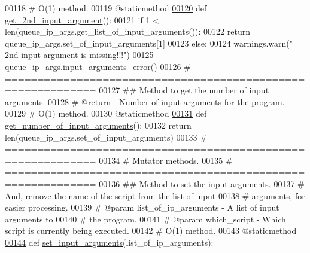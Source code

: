 \begin{DoxyCode}
00118     \textcolor{comment}{#   O(1) method.}
00119     @staticmethod
\hypertarget{queue__ip__arguments_8py_source_l00120}{}\hyperlink{classutilities_1_1queue__ip__arguments_1_1queue__ip__args_a18e59da1e2c8044e79ca32a5455ef40b}{00120}     \textcolor{keyword}{def }\hyperlink{classutilities_1_1queue__ip__arguments_1_1queue__ip__args_a18e59da1e2c8044e79ca32a5455ef40b}{get\_2nd\_input\_argument}():
00121         \textcolor{keywordflow}{if} 1 < len(queue\_ip\_args.get\_list\_of\_input\_arguments()):
00122             \textcolor{keywordflow}{return} queue\_ip\_args.set\_of\_input\_arguments[1]
00123         \textcolor{keywordflow}{else}:
00124             warnings.warn(\textcolor{stringliteral}{" 2nd input argument is missing!!!"})
00125             queue\_ip\_args.input\_arguments\_error()
00126     \textcolor{comment}{# ============================================================}
00127     \textcolor{comment}{##  Method to get the number of input arguments.}
00128     \textcolor{comment}{#   @return - Number of input arguments for the program.}
00129     \textcolor{comment}{#   O(1) method.}
00130     @staticmethod
\hypertarget{queue__ip__arguments_8py_source_l00131}{}\hyperlink{classutilities_1_1queue__ip__arguments_1_1queue__ip__args_ab95a4242fd55bf5d126b35a5f5172593}{00131}     \textcolor{keyword}{def }\hyperlink{classutilities_1_1queue__ip__arguments_1_1queue__ip__args_ab95a4242fd55bf5d126b35a5f5172593}{get\_number\_of\_input\_arguments}():
00132         \textcolor{keywordflow}{return} len(queue\_ip\_args.set\_of\_input\_arguments)
00133     \textcolor{comment}{# ============================================================}
00134     \textcolor{comment}{#   Mutator methods.}
00135     \textcolor{comment}{# ============================================================}
00136     \textcolor{comment}{##  Method to set the input arguments.}
00137     \textcolor{comment}{#       And, remove the name of the script from the list of input}
00138     \textcolor{comment}{#       arguments, for easier processing.}
00139     \textcolor{comment}{#   @param list\_of\_ip\_arguments - A list of input arguments to}
00140     \textcolor{comment}{#       the program.}
00141     \textcolor{comment}{#   @param which\_script - Which script is currently being executed.}
00142     \textcolor{comment}{#   O(1) method.}
00143     @staticmethod
\hypertarget{queue__ip__arguments_8py_source_l00144}{}\hyperlink{classutilities_1_1queue__ip__arguments_1_1queue__ip__args_a4b34415e7ff12abecd89b1e10755aa8d}{00144}     \textcolor{keyword}{def }\hyperlink{classutilities_1_1queue__ip__arguments_1_1queue__ip__args_a4b34415e7ff12abecd89b1e10755aa8d}{set\_input\_arguments}(list\_of\_ip\_arguments):

\end{DoxyCode}
